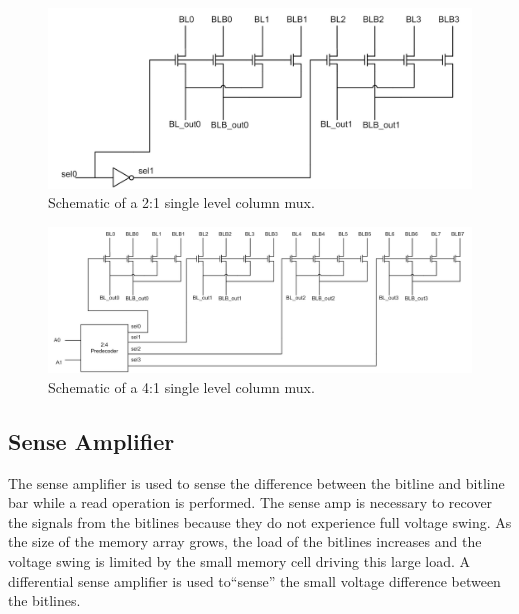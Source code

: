 \begin{figure}[h!]
\centering
\includegraphics[scale=.7]{./figs/2t1_single_level_column_mux.pdf}
\caption{Schematic of a 2:1 single level column mux.}
\label{fig:2t1_single_level_column_mux}
\end{figure}



\begin{figure}[h!]
\centering
\includegraphics[scale=.6]{./figs/4t1_single_level_column_mux.pdf}
\caption{Schematic of a 4:1 single level column mux.}
\label{fig:4t1_single_level_column_mux}
\end{figure}


\subsection{Sense Amplifier}
\label{sec:senseamp}
The sense amplifier is used to sense the difference between the
bitline and bitline bar while a read operation is performed.  The
sense amp is necessary to recover the signals from the bitlines
because they do not experience full voltage swing.  As the size of the
memory array grows, the load of the bitlines increases and the voltage
swing is limited by the small memory cell driving this large load.  A
differential sense amplifier is used to``sense'' the small voltage
difference between the bitlines.

